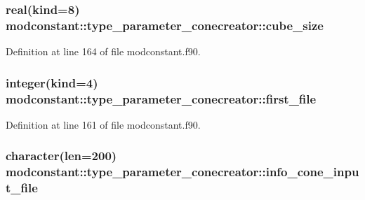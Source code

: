 \hypertarget{structmodconstant_1_1type__parameter__conecreator_a5123eeb98fd44cbe5ce7b83c97441108}{
\subsubsection[{cube\-\_\-size}]{\setlength{\rightskip}{0pt plus 5cm}real(kind=8) modconstant\-::type\-\_\-parameter\-\_\-conecreator\-::cube\-\_\-size}}\label{structmodconstant_1_1type__parameter__conecreator_a5123eeb98fd44cbe5ce7b83c97441108}


Definition at line 164 of file modconstant.\-f90.

\hypertarget{structmodconstant_1_1type__parameter__conecreator_a2378ef5e20c6ff83414d69b9c19c0bbd}{
\subsubsection[{first\-\_\-file}]{\setlength{\rightskip}{0pt plus 5cm}integer(kind=4) modconstant\-::type\-\_\-parameter\-\_\-conecreator\-::first\-\_\-file}}\label{structmodconstant_1_1type__parameter__conecreator_a2378ef5e20c6ff83414d69b9c19c0bbd}


Definition at line 161 of file modconstant.\-f90.

\hypertarget{structmodconstant_1_1type__parameter__conecreator_a5f8f89332e28a5774a6bc136b842cdd9}{
\subsubsection[{info\-\_\-cone\-\_\-input\-\_\-file}]{\setlength{\rightskip}{0pt plus 5cm}character(len=200) modconstant\-::type\-\_\-parameter\-\_\-conecreator\-::info\-\_\-cone\-\_\-input\-\_\-file}}\label{structmodconstant_1_1type__parameter__conecreator_a5f8f89332e28a5774a6bc136b842cdd9}


